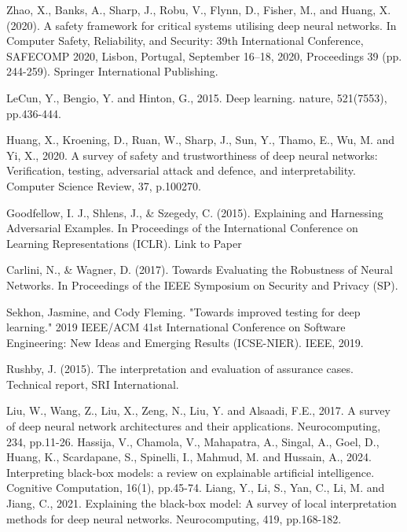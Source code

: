 \label{chp:5}
\begin{singlespace}
\begin{thebibliography}{}


Zhao, X., Banks, A., Sharp, J., Robu, V., Flynn, D., Fisher, M., and Huang, X. (2020). A safety framework for critical systems utilising deep neural networks. In Computer Safety, Reliability, and Security: 39th International Conference, SAFECOMP 2020, Lisbon, Portugal, September 16–18, 2020, Proceedings 39 (pp. 244-259). Springer International Publishing.


LeCun, Y., Bengio, Y. and Hinton, G., 2015. Deep learning. nature, 521(7553), pp.436-444.

Huang, X., Kroening, D., Ruan, W., Sharp, J., Sun, Y., Thamo, E., Wu, M. and Yi, X., 2020. A survey of safety and trustworthiness of deep neural networks: Verification, testing, adversarial attack and defence, and interpretability. Computer Science Review, 37, p.100270.


 Goodfellow, I. J., Shlens, J., \& Szegedy, C. (2015). Explaining and Harnessing Adversarial Examples. In Proceedings of the International Conference on Learning Representations (ICLR). Link to Paper

 Carlini, N., \& Wagner, D. (2017). Towards Evaluating the Robustness of Neural Networks. In Proceedings of the IEEE Symposium on Security and Privacy (SP).
   
 Sekhon, Jasmine, and Cody Fleming. "Towards improved testing for deep learning." 2019 IEEE/ACM 41st International Conference on Software Engineering: New Ideas and Emerging Results (ICSE-NIER). IEEE, 2019.

Rushby, J. (2015). The interpretation and evaluation of assurance cases. Technical report, SRI International.



 Liu, W., Wang, Z., Liu, X., Zeng, N., Liu, Y. and Alsaadi, F.E., 2017. A survey of deep neural network architectures and their applications. Neurocomputing, 234, pp.11-26.    Hassija, V., Chamola, V., Mahapatra, A., Singal, A., Goel, D., Huang, K., Scardapane, S., Spinelli, I., Mahmud, M. and Hussain, A., 2024. Interpreting black-box models: a review on explainable artificial intelligence. Cognitive Computation, 16(1), pp.45-74.
 Liang, Y., Li, S., Yan, C., Li, M. and Jiang, C., 2021. Explaining the black-box model: A survey of local interpretation methods for deep neural networks. Neurocomputing, 419, pp.168-182.


\end{thebibliography}
\end{singlespace}
